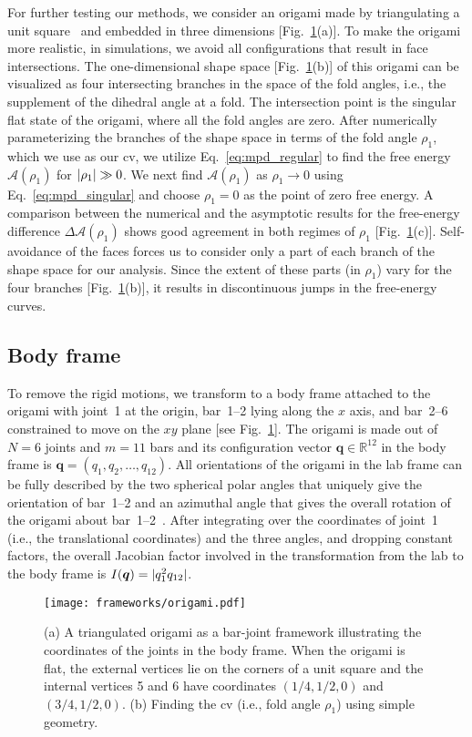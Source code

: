 For further testing our methods, we consider an origami made by triangulating a unit square~\cite{chen2018} and embedded in three dimensions [Fig.~\ref{fig:origami}(a)].
To make the origami more realistic, in simulations, we avoid all configurations that result in face intersections.
The one-dimensional shape space [Fig.~\ref{fig:origami}(b)] of this origami can be visualized as four intersecting branches in the space of the fold angles, i.e., the supplement of the dihedral angle at a fold.
The intersection point is the singular flat state of the origami, where all the fold angles are zero.
After numerically parameterizing the branches of the shape space in terms of the fold angle $\rho_{1}$, which we use as our \ac{cv}, we utilize Eq.~\eqref{eq:mpd_regular} to find the free energy $\mathscr{A}(\rho_{1})$ for $\lvert\rho_{1}\rvert \gg 0$.
We next find $\mathscr{A}(\rho_{1})$ as $\rho_{1} \to 0$ using Eq.~\eqref{eq:mpd_singular} and choose $\rho_{1}=0$ as the point of zero free energy.
A comparison between the numerical and the asymptotic results for the free-energy difference  $\Delta\mathscr{A}(\rho_{1})$ shows good agreement in both regimes of $\rho_{1}$ [Fig.~\ref{fig:origami}(c)].
Self-avoidance of the faces forces us to consider only a part of each branch of the shape space for our analysis.
Since the extent of these parts (in $\rho_{1}$) vary for the four branches [Fig.~\ref{fig:origami}(b)], it results in discontinuous jumps in the free-energy curves.

\subsection{Body frame}

To remove the rigid motions, we transform to a body frame attached to the origami with joint~1 at the origin, bar~1--2 lying along the $x$ axis, and bar~2--6 constrained to move on the $xy$ plane [see Fig.~\ref{fig:origami}].
The origami is made out of $N = 6$ joints and $m = 11$ bars and its configuration vector $\bm{q} \in \mathbb{R}^{12}$ in the body frame is $\bm{q} = (q_{1}, q_{2}, \ldots, q_{12})$.
All orientations of the origami in the lab frame can be fully described by the two spherical polar angles that uniquely give the orientation of bar~1--2 and an azimuthal angle that gives the overall rotation of the origami about bar~1--2~\cite{herschbach1959}.
After integrating over the coordinates of joint~1 (i.e., the translational coordinates) and the three angles, and dropping constant factors, the overall Jacobian factor involved in the transformation from the lab to the body frame is $I(\bm{q}) = \lvert q_1^2 q_{12}\rvert$.
%
\begin{figure}
  \begin{center}
    \texttt{[image: frameworks/origami.pdf]}
  \end{center}
  \caption{(a) A triangulated origami as a bar-joint framework illustrating the coordinates of the joints in the body frame. When the origami is flat, the external vertices lie on the corners of a unit square and the internal vertices 5 and 6 have coordinates $(1/4,1/2,0)$ and $(3/4,1/2,0)$. (b) Finding the \ac{cv} (i.e., fold angle $\rho_{1}$) using simple geometry.}
  \label{fig:origami}
\end{figure}

